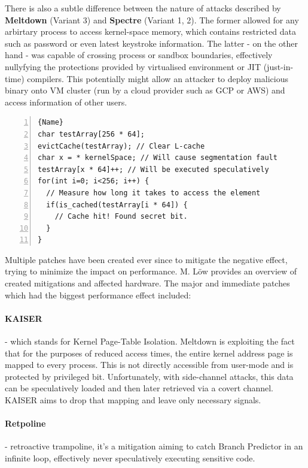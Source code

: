 \documentclass{csfourzero}
\begin{document}
There is also a subtle difference between the nature of attacks described by \textbf{Meltdown} (Variant 3) and \textbf{Spectre} (Variant 1, 2). The former allowed for any arbirtary process to access kernel-space memory, which contains restricted data such as password or even latest keystroke information. The latter - on the other hand - was capable of crossing process or sandbox boundaries, effectively nullyfying the protections provided by virtualised environment or JIT (just-in-time) compilers. This potentially might allow an attacker to deploy malicious binary onto VM cluster (run by a cloud provider such as GCP or AWS) and access information of other users.

\begin{lstlisting}[caption=Meltdown PoC,frame=tlrb, numbers=left, firstnumber=1]{Name}
char testArray[256 * 64];
evictCache(testArray); // Clear L-cache
char x = * kernelSpace; // Will cause segmentation fault
testArray[x * 64]++; // Will be executed speculatively
for(int i=0; i<256; i++) {
  // Measure how long it takes to access the element
  if(is_cached(testArray[i * 64]) {
    // Cache hit! Found secret bit.
  }
}
\end{lstlisting}

Multiple patches have been created ever since to mitigate the negative effect, trying to minimize the impact on performance. M. L{\"o}w\cite{low2018overview} provides an overview of created mitigations and affected hardware. The major and immediate patches which had the biggest performance effect included:

\paragraph{KAISER} \cite{corbet2017current} - which stands for Kernel Page-Table Isolation. Meltdown is exploiting the fact that for the purposes of reduced access times, the entire kernel address page is mapped to every process. This is not directly accessible from user-mode and is protected by privileged bit. Unfortunately, with side-channel attacks, this data can be speculatively loaded and then later retrieved via a covert channel. KAISER aims to drop that mapping and leave only necessary signals.
\paragraph{Retpoline} \cite{turner2018retpoline} - retroactive trampoline, it's a mitigation aiming to catch Branch Predictor in an infinite loop, effectively never speculatively executing sensitive code.
\end{document}
